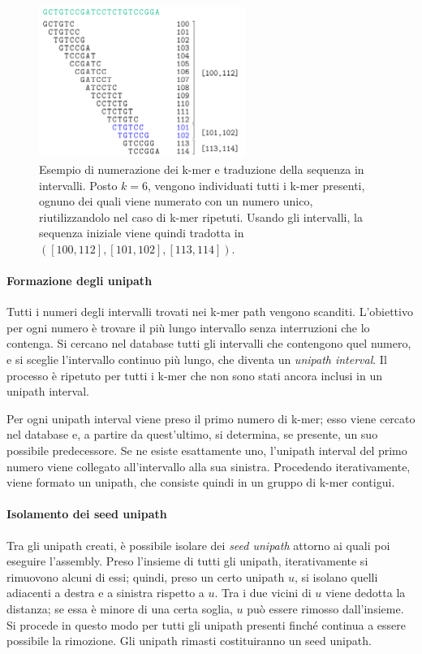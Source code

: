 \documentclass[crop=false, class=book]{standalone}
\begin{document}
	\begin{figure}
		\centering
		\includegraphics[width=0.6\textwidth]{capitoli/allpaths/numbering.png}
		\caption{Esempio di numerazione dei k-mer e traduzione della sequenza in intervalli. Posto $k=6$, vengono individuati tutti i k-mer presenti, ognuno dei quali viene numerato con un numero unico, riutilizzandolo nel caso di k-mer ripetuti. Usando gli intervalli, la sequenza iniziale viene quindi tradotta in $([100,112], [101, 102], [113, 114])$.}
		\label{fig:allpathsnumbering}
	\end{figure}
	
	\paragraph{Formazione degli unipath}
	Tutti i numeri degli intervalli trovati nei k-mer path vengono scanditi. L'obiettivo per ogni numero è trovare il più lungo intervallo senza interruzioni che lo contenga. Si cercano nel database tutti gli intervalli che contengono quel numero, e si sceglie l'intervallo continuo più lungo, che diventa un \textit{unipath interval}. Il processo è ripetuto per tutti i k-mer che non sono stati ancora inclusi in un unipath interval. 
	
	Per ogni unipath interval viene preso il primo numero di k-mer; esso viene cercato nel database e, a partire da quest'ultimo, si determina, se presente, un suo possibile predecessore. Se ne esiste esattamente uno, l'unipath interval del primo numero viene collegato all'intervallo alla sua sinistra. Procedendo iterativamente, viene formato un unipath, che consiste quindi in un gruppo di k-mer contigui. 
	
	\paragraph{Isolamento dei seed unipath}
	Tra gli unipath creati, è possibile isolare dei \textit{seed unipath} attorno ai quali poi eseguire l'assembly. Preso l'insieme di tutti gli unipath, iterativamente si rimuovono alcuni di essi; quindi, preso un certo unipath $u$, si isolano quelli adiacenti a destra e a sinistra rispetto a $u$. Tra i due vicini di $u$ viene dedotta la distanza; se essa è minore di una certa soglia, $u$ può essere rimosso dall'insieme. Si procede in questo modo per tutti gli unipath presenti finché continua a essere possibile la rimozione. Gli unipath rimasti costituiranno un seed unipath.
	
\end{document}

